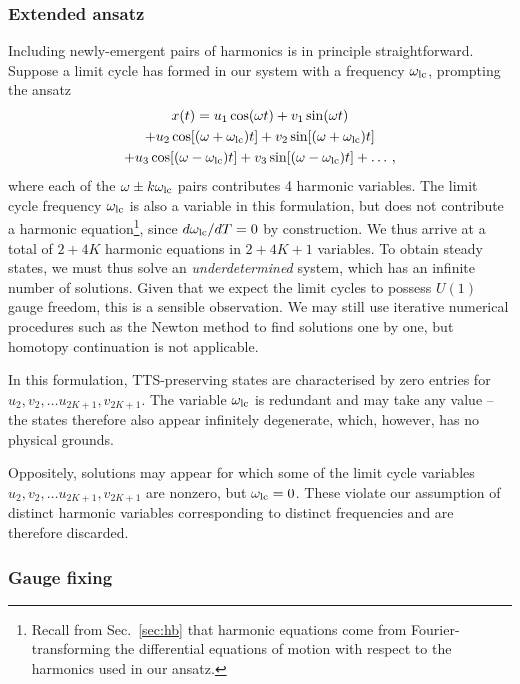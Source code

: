 \subsubsection{Extended ansatz}

Including newly-emergent pairs of harmonics is in principle straightforward. Suppose a limit cycle has formed in our system with a frequency $\omega_{\rm lc}$, prompting the ansatz
\begin{multline} \label{eq:hopf_extansatz}
x(t) = u_1 \cos(\omega t) + v_1 \sin(\omega t) 
\\ +  u_2 \cos[(\omega + \omega_{\rm lc}) t] + v_2 \sin[(\omega + \omega_{\rm lc}) t] 
\\ + u_3 \cos[(\omega - \omega_{\rm lc}) t] + v_3 \sin[(\omega - \omega_{\rm lc}) t]+ \ldots \,,
\end{multline}
where each of the $\omega \pm k \omega_{\rm lc}$ pairs contributes 4 harmonic variables. The limit cycle frequency $\omega_{\rm lc}$ is also a variable in this formulation, but does not contribute a harmonic equation\footnote{Recall from Sec.~\ref{sec:hb} that harmonic equations come from Fourier-transforming the differential equations of motion with respect to the harmonics used in our ansatz.}, since $d \omega_{\rm lc} / dT = 0$ by construction. We thus arrive at a total of $2 + 4K$ harmonic equations in $2 + 4K + 1$ variables. To obtain steady states, we must thus solve an \textit{underdetermined} system, which has an infinite number of solutions. Given that we expect the limit cycles to possess $U(1)$ gauge freedom, this is a sensible observation. We may still use iterative numerical procedures such as the Newton method to find solutions one by one, but homotopy continuation is not applicable. 

In this formulation, TTS-preserving states are characterised by zero entries for $u_2, v_2, \ldots u_{2K+1}, v_{2K+1}$. The variable $\omega_{\rm lc}$ is redundant and may take any value -- the states therefore also appear infinitely degenerate, which, however, has no physical grounds.

Oppositely, solutions may appear for which some of the limit cycle variables $u_2, v_2, \ldots u_{2K+1}, v_{2K+1}$ are nonzero, but $\omega_{\rm lc} = 0$. These violate our assumption of distinct harmonic variables corresponding to distinct frequencies and are therefore discarded. 
\subsubsection{Gauge fixing}

